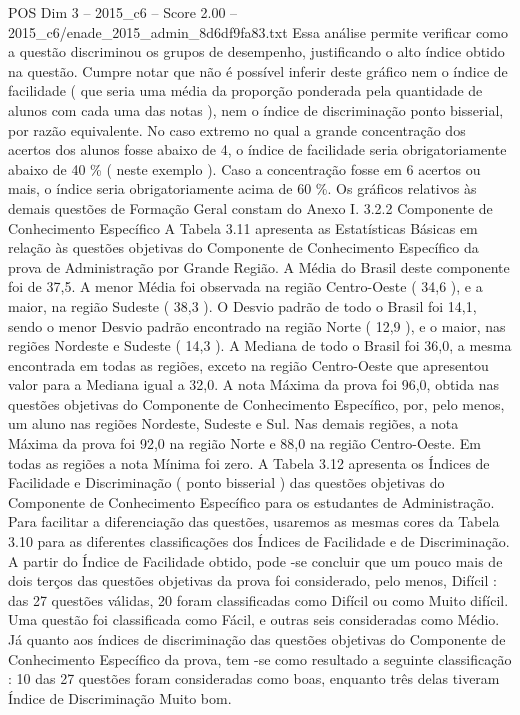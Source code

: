 \begin{textsample}{POS Dim 3 – 2015\_c6 – Score 2.00 – 2015\_c6/enade\_2015\_admin\_8d6df9fa83.txt}
Essa análise permite verificar como a questão discriminou os grupos de desempenho, justificando o alto índice obtido na questão.
Cumpre notar que não é possível inferir deste gráfico nem o índice de facilidade ( que seria uma média da proporção ponderada pela quantidade de alunos com cada uma das notas ), nem o índice de discriminação ponto bisserial, por razão equivalente.
No caso extremo no qual a grande concentração dos acertos dos alunos fosse abaixo de 4, o índice de facilidade seria obrigatoriamente abaixo de 40 \% ( neste exemplo ).
Caso a concentração fosse em 6 acertos ou mais, o índice seria obrigatoriamente acima de 60 \%.
Os gráficos relativos às demais questões de Formação Geral constam do Anexo I. 3.2.2 Componente de Conhecimento Específico A Tabela 3.11 apresenta as Estatísticas Básicas em relação às questões objetivas do Componente de Conhecimento Específico da prova de Administração por Grande Região.
A Média do Brasil deste componente foi de 37,5.
A menor Média foi observada na região Centro-Oeste ( 34,6 ), e a maior, na região Sudeste ( 38,3 ).
O Desvio padrão de todo o Brasil foi 14,1, sendo o menor Desvio padrão encontrado na região Norte ( 12,9 ), e o maior, nas regiões Nordeste e Sudeste ( 14,3 ).
A Mediana de todo o Brasil foi 36,0, a mesma encontrada em todas as regiões, exceto na região Centro-Oeste que apresentou valor para a Mediana igual a 32,0.
A nota Máxima da prova foi 96,0, obtida nas questões objetivas do Componente de Conhecimento Específico, por, pelo menos, um aluno nas regiões Nordeste, Sudeste e Sul.
Nas demais regiões, a nota Máxima da prova foi 92,0 na região Norte e 88,0 na região Centro-Oeste.
Em todas as regiões a nota Mínima foi zero.
A Tabela 3.12 apresenta os Índices de Facilidade e Discriminação ( ponto bisserial ) das questões objetivas do Componente de Conhecimento Específico para os estudantes de Administração.
Para facilitar a diferenciação das questões, usaremos as mesmas cores da Tabela 3.10 para as diferentes classificações dos Índices de Facilidade e de Discriminação.
A partir do Índice de Facilidade obtido, pode -se concluir que um pouco mais de dois terços das questões objetivas da prova foi considerado, pelo menos, Difícil : das 27 questões válidas, 20 foram classificadas como Difícil ou como Muito difícil.
Uma questão foi classificada como Fácil, e outras seis consideradas como Médio.
Já quanto aos índices de discriminação das questões objetivas do Componente de Conhecimento Específico da prova, tem -se como resultado a seguinte classificação : 10 das 27 questões foram consideradas como boas, enquanto três delas tiveram Índice de Discriminação Muito bom.

\end{textsample}
